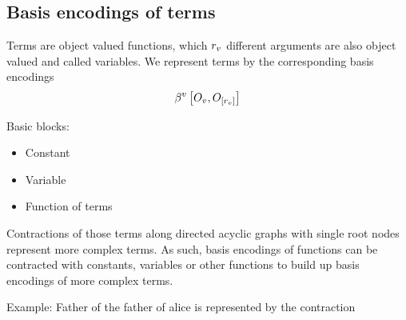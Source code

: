 \subsection{Basis encodings of terms}

Terms are object valued functions, which $r_{v}$ different arguments are also object valued and called variables.
We represent terms by the corresponding basis encodings
\begin{align*}
    \bencodingofat{\folterm}{
        \indvariableof{\folterm}, \indvariableof{[r_{\folterm}]}
    }
\end{align*}

Basic blocks:
\begin{itemize}
    \item Constant
    \item Variable
    \item Function of terms
\end{itemize}
Contractions of those terms along directed acyclic graphs with single root nodes represent more complex terms.
As such, basis encodings of functions can be contracted with constants, variables or other functions to build up basis encodings of more complex terms.

Example: Father of the father of alice is represented by the contraction


